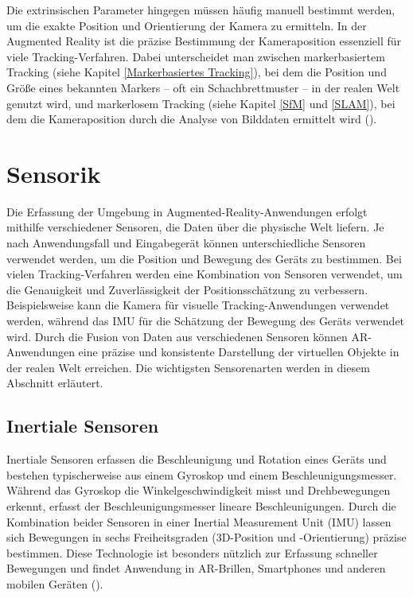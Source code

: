 Die extrinsischen Parameter hingegen müssen häufig manuell bestimmt werden, um die exakte Position und Orientierung der Kamera zu ermitteln. In der Augmented Reality ist die präzise Bestimmung der Kameraposition essenziell für viele Tracking-Verfahren. Dabei unterscheidet man zwischen markerbasiertem Tracking (siehe Kapitel \ref{Markerbasiertes Tracking}), bei dem die Position und Größe eines bekannten Markers – oft ein Schachbrettmuster – in der realen Welt genutzt wird, und markerlosem Tracking (siehe Kapitel \ref{SfM} und \ref{SLAM}), bei dem die Kameraposition durch die Analyse von Bilddaten ermittelt wird (\cite{doerner2022virtual, alam2024calibration}).

\section{Sensorik}

Die Erfassung der Umgebung in Augmented-Reality-Anwendungen erfolgt mithilfe verschiedener Sensoren, die Daten über die physische Welt liefern. Je nach Anwendungsfall und Eingabegerät können unterschiedliche Sensoren verwendet werden, um die Position und Bewegung des Geräts zu bestimmen. Bei vielen Tracking-Verfahren werden eine Kombination von Sensoren verwendet, um die Genauigkeit und Zuverlässigkeit der Positionsschätzung zu verbessern. Beispielsweise kann die Kamera für visuelle Tracking-Anwendungen verwendet werden, während das IMU für die Schätzung der Bewegung des Geräts verwendet wird. Durch die Fusion von Daten aus verschiedenen Sensoren können AR-Anwendungen eine präzise und konsistente Darstellung der virtuellen Objekte in der realen Welt erreichen. Die wichtigsten Sensorenarten werden in diesem Abschnitt erläutert.

\subsection{Inertiale Sensoren}

Inertiale Sensoren erfassen die Beschleunigung und Rotation eines Geräts und bestehen typischerweise aus einem Gyroskop und einem Beschleunigungsmesser. Während das Gyroskop die Winkelgeschwindigkeit misst und Drehbewegungen erkennt, erfasst der Beschleunigungsmesser lineare Beschleunigungen. Durch die Kombination beider Sensoren in einer Inertial Measurement Unit (IMU) lassen sich Bewegungen in sechs Freiheitsgraden (3D-Position und -Orientierung) präzise bestimmen. Diese Technologie ist besonders nützlich zur Erfassung schneller Bewegungen und findet Anwendung in AR-Brillen, Smartphones und anderen mobilen Geräten (\cite{doerner2022virtual}).

